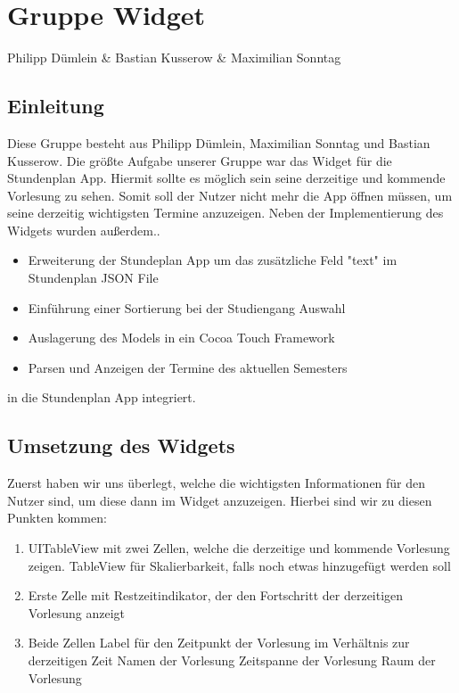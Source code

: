 \chapter{Gruppe Widget}
Philipp Dümlein \& Bastian Kusserow \& Maximilian Sonntag

\section{Einleitung}
Diese Gruppe besteht aus Philipp Dümlein, Maximilian Sonntag und Bastian Kusserow.
Die größte Aufgabe unserer Gruppe war das Widget für die Stundenplan App. Hiermit sollte es möglich sein seine derzeitige und kommende Vorlesung zu sehen. Somit soll der Nutzer nicht mehr die App öffnen müssen, um seine derzeitig wichtigsten Termine anzuzeigen. 
Neben der Implementierung des Widgets wurden außerdem..
\begin{itemize}
\item Erweiterung der Stundeplan App um das zusätzliche Feld "text"  im Stundenplan JSON File
\item Einführung einer Sortierung bei der Studiengang Auswahl
\item Auslagerung des Models in ein Cocoa Touch Framework
\item Parsen und Anzeigen der Termine des aktuellen Semesters
\end{itemize}
in die Stundenplan App integriert.

\section{Umsetzung des Widgets}

Zuerst haben wir uns überlegt, welche die wichtigsten Informationen für den Nutzer sind, um diese dann im Widget anzuzeigen. Hierbei sind wir zu diesen Punkten kommen:

\begin{enumerate}
\item UITableView mit zwei Zellen, welche die derzeitige und kommende Vorlesung zeigen. TableView für Skalierbarkeit, falls noch etwas hinzugefügt werden soll
\item Erste Zelle mit Restzeitindikator, der den Fortschritt der derzeitigen Vorlesung anzeigt
\item Beide Zellen
\subitem Label für den Zeitpunkt der Vorlesung im Verhältnis zur derzeitigen Zeit
\subitem Namen der Vorlesung
\subitem Zeitspanne der Vorlesung
\subitem Raum der Vorlesung
\end{enumerate}

